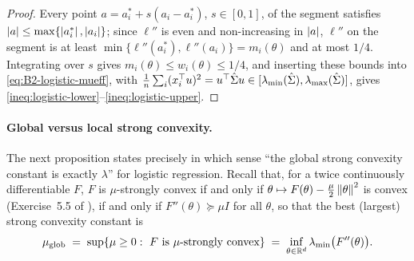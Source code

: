 \begin{proof}
Every point $a=a_i^\ast+s(a_i-a_i^\ast)$, $s\in[0,1]$, of the segment satisfies
$\left|a\right|\le\max\{\left|a_i^\ast\right|,\left|a_i\right|\}$; since $\ell''$ is even and non-increasing in $\left|a\right|$, $\ell''$ on the
segment is at least $\min\{\ell''(a_i^\ast),\ell''(a_i)\}=m_i(\theta)$ and at most
$1/4$. Integrating over $s$ gives $m_i(\theta)\le w_i(\theta)\le1/4$, and inserting these bounds into
\eqref{eq:B2-logistic-mueff}, with $\frac1n\sum_i(x_i^\top u)^2=u^\top\hat\Sigma u\in[\lambda_{\min}(\hat\Sigma),\lambda_{\max}(\hat\Sigma)]$,
gives \eqref{ineq:logistic-lower}--\eqref{ineq:logistic-upper}.
\end{proof}

\paragraph{Global versus local strong convexity.}
The next proposition states precisely in which sense ``the global strong convexity constant is exactly
$\lambda$'' for logistic regression. Recall that, for a twice continuously differentiable $F$, $F$ is
$\mu$-strongly convex if and only if $\theta\mapsto F(\theta)-\frac\mu2\left\|\theta\right\|^2$ is convex
(Exercise~5.5 of \cite{bach2024learning}), if and only if $F''(\theta)\succcurlyeq\mu I$ for all $\theta$, so that
the best (largest) strong convexity constant is
\[
\mu_{\mathrm{glob}}\;=\;\sup\{\mu\ge0:\ F\text{ is $\mu$-strongly convex}\}\;=\;\inf_{\theta\in\mathbb{R}^d}\lambda_{\min}\big(F''(\theta)\big).
\]

